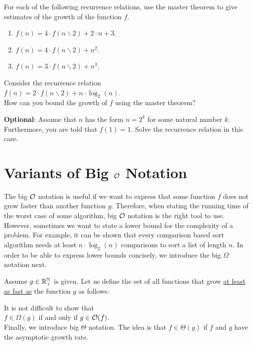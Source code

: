 \exercise
For each of the following recurrence relations, use the master theorem to give estimates of the
growth of the function $f$. 
\begin{enumerate}
\item $f(n) = 4 \cdot f(n \backslash 2) + 2 \cdot n + 3$.
\item $f(n) = 4 \cdot f(n \backslash 2) + n^2$.
\item $f(n) = 3 \cdot f(n \backslash 2) + n^3$.  \eox
\end{enumerate}

\exercise
Consider the recurrence relation
\\[0.2cm]
\hspace*{1.3cm}
$f(n) = 2 \cdot f(n \backslash 2) + n \cdot \log_2(n)$.
\\[0.2cm] 
How can you bound the growth of $f$ using the master theorem? 
\vspace*{0.1cm}

\noindent
\textbf{Optional}: Assume that $n$ has the form $n = 2^k$ for some natural number $k$.
Furthermore, you are told that $f(1) = 1$.  Solve the recurrence relation in this case.
\eox

\section{Variants of Big $\mathcal{O}$ Notation}
The big $\mathcal{O}$ notation is useful if we want to express that some function $f$ does not grow faster
than another function $g$.  Therefore, when stating the running time of the worst case of some algorithm,
big $\mathcal{O}$ notation is the right tool to use.  However, sometimes we want to state a lower bound for
the complexity of a problem.  For example, it can be shown that every comparison based sort algorithm needs at least
$n \cdot \log_2(n)$ comparisons to sort a list of length $n$.  In order to be able to express lower
bounds concisely, we introduce the big $\Omega$ notation next.

\begin{Definition}[$\Omega(g)$] 
  Assume $g \in {\mathbb R}_+^{{\mathbb N}}$ is given.   Let us define the set of all functions that grow 
  \underline{at least as fast as} the function $g$ as follows:
  \\[0.2cm]
  \hspace*{0.5cm} 
  \colorbox{red}{}
  \eox
\end{Definition}
It is not difficult to show that
\\[0.2cm]
\hspace*{1.3cm}
 $f \in \Omega(g)$ \quad if and only if \quad $g \in \mathcal{O}(f)$.
\\[0.2cm]
Finally, we introduce big $\Theta$ notation.  The idea is that $f \in \Theta(g)$ if 
$f$ and $g$ have the  asymptotic growth rate. 


